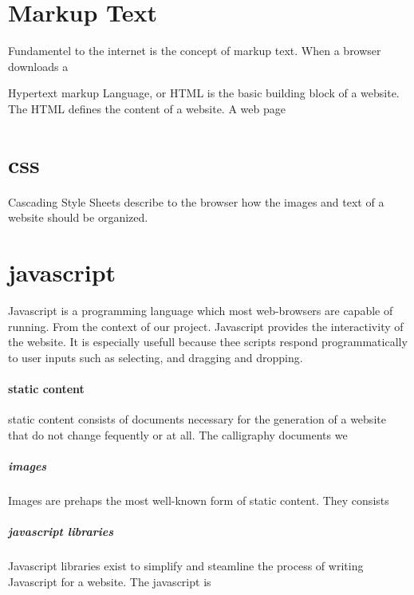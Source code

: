 \chapter{Markup Text}

Fundamentel to the internet is the concept of markup text.  When a browser downloads a 

Hypertext markup Language, or HTML is the basic building block of a website.  The HTML defines the content of a website.  A web page 

\chapter{css}

Cascading Style Sheets describe to the browser how the images and text of a website should be organized.  

\chapter{javascript}

Javascript is a programming language which most web-browsers are capable of running.  From the context of our project.  Javascript provides the interactivity of the website.  It is especially usefull because thee scripts respond programmatically to user inputs such as selecting, and dragging and dropping.  






\subsubsection{static content}

static content consists of documents necessary for the generation of a website that do not change fequently or at all.  The calligraphy documents we 

\paragraph{images}

Images are prehaps the most well-known form of static content.  They consists

\paragraph{javascript libraries}

Javascript libraries exist to simplify and steamline the process of writing Javascript for a website.  The javascript is 


